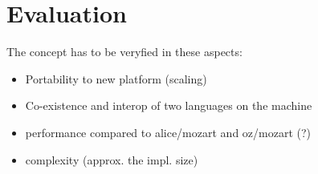 \section{Evaluation}
The concept has to be veryfied in these aspects: 
\begin{itemize}
\item Portability to new platform (scaling)
\item Co-existence and interop of two languages on the machine
\item performance compared to alice/mozart and oz/mozart (?)
\item complexity (approx. the impl. size)
\end{itemize}
